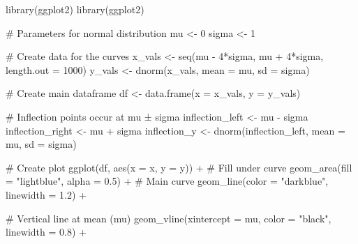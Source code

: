 \documentclass[
  letterpaper,
  DIV=11,
  numbers=noendperiod]{scrreprt}
\newenvironment{Shaded}{\begin{snugshade}}{\end{snugshade}}
\newcommand{\AttributeTok}[1]{\textcolor[rgb]{0.40,0.45,0.13}{#1}}
\newcommand{\CommentTok}[1]{\textcolor[rgb]{0.37,0.37,0.37}{#1}}
\newcommand{\DecValTok}[1]{\textcolor[rgb]{0.68,0.00,0.00}{#1}}
\newcommand{\FloatTok}[1]{\textcolor[rgb]{0.68,0.00,0.00}{#1}}
\newcommand{\FunctionTok}[1]{\textcolor[rgb]{0.28,0.35,0.67}{#1}}
\newcommand{\NormalTok}[1]{\textcolor[rgb]{0.00,0.23,0.31}{#1}}
\newcommand{\OtherTok}[1]{\textcolor[rgb]{0.00,0.23,0.31}{#1}}
\newcommand{\SpecialCharTok}[1]{\textcolor[rgb]{0.37,0.37,0.37}{#1}}
\newcommand{\StringTok}[1]{\textcolor[rgb]{0.13,0.47,0.30}{#1}}
\begin{document}
\begin{Shaded}
\begin{Highlighting}[]
\FunctionTok{library}\NormalTok{(ggplot2)}
\FunctionTok{library}\NormalTok{(ggplot2)}

\CommentTok{\# Parameters for normal distribution}
\NormalTok{mu }\OtherTok{\textless{}{-}} \DecValTok{0}
\NormalTok{sigma }\OtherTok{\textless{}{-}} \DecValTok{1}

\CommentTok{\# Create data for the curves}
\NormalTok{x\_vals }\OtherTok{\textless{}{-}} \FunctionTok{seq}\NormalTok{(mu }\SpecialCharTok{{-}} \DecValTok{4}\SpecialCharTok{*}\NormalTok{sigma, mu }\SpecialCharTok{+} \DecValTok{4}\SpecialCharTok{*}\NormalTok{sigma, }\AttributeTok{length.out =} \DecValTok{1000}\NormalTok{)}
\NormalTok{y\_vals }\OtherTok{\textless{}{-}} \FunctionTok{dnorm}\NormalTok{(x\_vals, }\AttributeTok{mean =}\NormalTok{ mu, }\AttributeTok{sd =}\NormalTok{ sigma)}

\CommentTok{\# Create main dataframe}
\NormalTok{df }\OtherTok{\textless{}{-}} \FunctionTok{data.frame}\NormalTok{(}\AttributeTok{x =}\NormalTok{ x\_vals, }\AttributeTok{y =}\NormalTok{ y\_vals)}

\CommentTok{\# Inflection points occur at mu ± sigma}
\NormalTok{inflection\_left }\OtherTok{\textless{}{-}}\NormalTok{ mu }\SpecialCharTok{{-}}\NormalTok{ sigma}
\NormalTok{inflection\_right }\OtherTok{\textless{}{-}}\NormalTok{ mu }\SpecialCharTok{+}\NormalTok{ sigma}
\NormalTok{inflection\_y }\OtherTok{\textless{}{-}} \FunctionTok{dnorm}\NormalTok{(inflection\_left, }\AttributeTok{mean =}\NormalTok{ mu, }\AttributeTok{sd =}\NormalTok{ sigma)}

\CommentTok{\# Create plot}
\FunctionTok{ggplot}\NormalTok{(df, }\FunctionTok{aes}\NormalTok{(}\AttributeTok{x =}\NormalTok{ x, }\AttributeTok{y =}\NormalTok{ y)) }\SpecialCharTok{+}
  \CommentTok{\# Fill under curve}
  \FunctionTok{geom\_area}\NormalTok{(}\AttributeTok{fill =} \StringTok{"lightblue"}\NormalTok{, }\AttributeTok{alpha =} \FloatTok{0.5}\NormalTok{) }\SpecialCharTok{+}
  \CommentTok{\# Main curve}
  \FunctionTok{geom\_line}\NormalTok{(}\AttributeTok{color =} \StringTok{"darkblue"}\NormalTok{, }\AttributeTok{linewidth =} \FloatTok{1.2}\NormalTok{) }\SpecialCharTok{+}
  
  \CommentTok{\# Vertical line at mean (mu)}
  \FunctionTok{geom\_vline}\NormalTok{(}\AttributeTok{xintercept =}\NormalTok{ mu, }\AttributeTok{color =} \StringTok{"black"}\NormalTok{, }\AttributeTok{linewidth =} \FloatTok{0.8}\NormalTok{) }\SpecialCharTok{+}
  

\end{Highlighting}
\end{Shaded}
\end{document}
